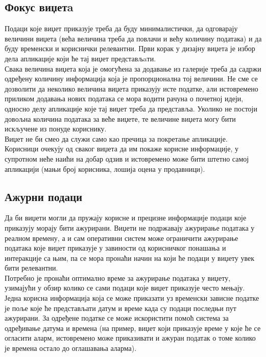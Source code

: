 \documentclass[12pt,oneside]{memoir}
\begin{document}
\subsection{Фокус виџетa}
\indent  Подаци које виџет приказује треба да буду минималистички, да одговарају величини виџета (већа величина треба да повлачи и већу количину података) и да буду временски и кориснички релевантни. Први корак у дизајну виџета је избор дела апликације који ће тај виџет представљaти. 
\\
\indent Свака величина виџета која је омогућена за додавање из галерије треба да садржи одређену количину информација која је пропорционална тој величини. Не сме се дозволити да неколико величина виџета приказују исте податке, али истовремено приликом додавања нових података се мора водити рачуна о почетној идеји, односно делу апликације које тај виџет треба да представља. Уколико не постоји довољна количина података за веће виџете, те величине виџета могу бити искључене из понуде кориснику.
\\
\indent Виџет не би смео да служи само као пречица за покретање апликације. Корисници очекују од сваког виџета да им покаже корисне информације, у супротном неће наићи на добар одзив и истовремено може бити штетно самој апликацији (мањи број корисника, лошија оцена у продавници).

\subsection{Ажурни подаци}
\indent Да би виџети могли да пружају корисне и прецизне информације подаци које приказују морају бити ажурирани. Виџети не подржавају ажурирање података у реалном времену, а и сам оперативни     систем може ограничити ажурирање података које виџет приказује у завиности од корисничког понашања и интеракције са њим, па се мора пронаћи начин на који ће подаци у виџету увек бити релевантни. 
\\
\indent Потребно је пронаћи оптимално време за ажурирање података у виџету, узимајући у обзир колико се сами подаци које виџет приказује често мењају. Једна корисна информација која се може приказати уз временски зависне податке је поље које ће представљати датум и време када су подаци последњи пут ажурирани. За одређене податке се може искористити помоћ система за одређивање датума и времена (на пример, виџет који приказује време у које ће се огласити аларм, истовремено може приказивати и ажуран податак о томе колико је времена остало до оглашавања аларма).
\end{document}
